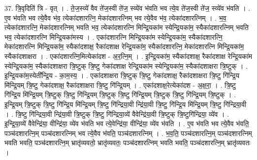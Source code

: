 \documentclass[17pt]{extarticle}
\begin{document}
37. त्रि॒वृदिति॑ त्रि - वृत् । . ते॒ज॒स्व्ये॑ वैव ते॑ज॒स्वी ते॑ज॒ स्व्ये॑व भ॑वति भव त्ये॒व ते॑ज॒स्वी ते॑ज॒ स्व्ये॑व भ॑वति । . ए॒व भ॑वति भव त्ये॒वैव भ॑व॒ त्येका॑दशारत्नि॒ मेका॑दशारत्निम् भव त्ये॒वैव भ॑व॒ त्येका॑दशारत्निम् । . भ॒व॒ त्येका॑दशारत्नि॒ मेका॑दशारत्निम् भवति भव॒ त्येका॑दशारत्नि मिन्द्रि॒यका॑म स्येन्द्रि॒यका॑म॒
स्यैका॑दशारत्निम् भवति भव॒ त्येका॑दशारत्नि मिन्द्रि॒यका॑मस्य । . एका॑दशारत्नि मिन्द्रि॒यका॑म स्येन्द्रि॒यका॑म॒ स्यैका॑दशारत्नि॒ मेका॑दशारत्नि मिन्द्रि॒यका॑म॒
स्यैका॑दशाक्ष॒ रैका॑दशाक्ष रेन्द्रि॒यका॑म॒ स्यैका॑दशारत्नि॒ मेका॑दशारत्नि मिन्द्रि॒यका॑म॒
स्यैका॑दशाक्षरा । . एका॑दशारत्नि॒मित्येका॑दश - अ॒र॒त्नि॒म् । . इ॒न्द्रि॒यका॑म॒ स्यैका॑दशाक्ष॒ रैका॑दशाक्ष रेन्द्रि॒यका॑म स्येन्द्रि॒यका॑म॒ स्यैका॑दशाक्षरा त्रि॒ष्टुक् त्रि॒ष्टु गेका॑दशाक्ष रेन्द्रि॒यका॑म स्येन्द्रि॒यका॑म॒ स्यैका॑दशाक्षरा त्रि॒ष्टुक् । . इ॒न्द्रि॒यका॑म॒स्येती᳚न्द्रि॒य - का॒म॒स्य॒ । . एका॑दशाक्षरा त्रि॒ष्टुक् त्रि॒ष्टु गेका॑दशाक्ष॒ रैका॑दशाक्षरा त्रि॒ष्टु गि॑न्द्रि॒य मि॑न्द्रि॒यम् त्रि॒ष्टु गेका॑दशाक्ष॒ रैका॑दशाक्षरा त्रि॒ष्टु गि॑न्द्रि॒यम् । . एका॑दशाक्ष॒रेत्येका॑दश - अ॒क्ष॒रा॒ । . त्रि॒ष्टु गि॑न्द्रि॒य मि॑न्द्रि॒यम् त्रि॒ष्टुक् त्रि॒ष्टु गि॑न्द्रि॒यम् त्रि॒ष्टुक् त्रि॒ष्टु गि॑न्द्रि॒यम् त्रि॒ष्टुक् त्रि॒ष्टु
गि॑न्द्रि॒यम् त्रि॒ष्टुक् । . इ॒न्द्रि॒यम् त्रि॒ष्टुक् त्रि॒ष्टु गि॑न्द्रि॒य मि॑न्द्रि॒यम् त्रि॒ष्टु गि॑न्द्रिया॒वी न्द्रि॑या॒वी त्रि॒ष्टु गि॑न्द्रि॒य मि॑न्द्रि॒यम् त्रि॒ष्टु गि॑न्द्रिया॒वी । . त्रि॒ष्टु गि॑न्द्रिया॒वी न्द्रि॑या॒वी त्रि॒ष्टुक् त्रि॒ष्टु गि॑न्द्रिया॒व्ये॑ वैवेन्द्रि॑या॒वी त्रि॒ष्टुक् त्रि॒ष्टुगि॑न्द्रिया॒ व्ये॑व । . इ॒न्द्रि॒या॒व्ये॑ वैवेन्द्रि॑या॒ वीन्द्रि॑या॒ व्ये॑व भ॑वति भव त्ये॒वेन्द्रि॑या॒ वीन्द्रि॑या॒ व्ये॑व भ॑वति । . ए॒व भ॑वति भव त्ये॒वैव भ॑वति॒ पञ्च॑दशारत्नि॒म् पञ्च॑दशारत्निम् भव त्ये॒वैव भ॑वति॒ पञ्च॑दशारत्निम् । . भ॒व॒ति॒ पञ्च॑दशारत्नि॒म् पञ्च॑दशारत्निम् भवति भवति॒ पञ्च॑दशारत्नि॒म् भ्रातृ॑व्यवतो॒ भ्रातृ॑व्यवतः॒ पञ्च॑दशारत्निम् भवति भवति॒ पञ्च॑दशारत्नि॒म् भ्रातृ॑व्यवतः । \newline
\end{document}
